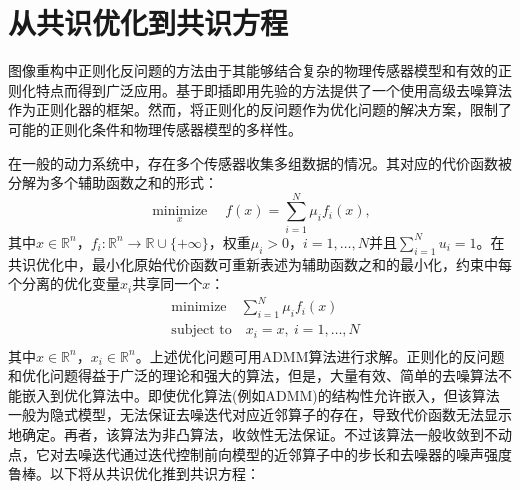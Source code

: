 \section{从共识优化到共识方程}
图像重构中正则化反问题的方法由于其能够结合复杂的物理传感器模型和有效的正则化特点而得到广泛应用\supercite{Gregery,Joon,Kamilov,Siavash,Yankun,Zhang}。基于即插即用先验的方法提供了一个使用高级去噪算法作为正则化器的框架。然而，将正则化的反问题作为优化问题的解决方案，限制了可能的正则化条件和物理传感器模型的多样性。

在一般的动力系统中，存在多个传感器收集多组数据的情况。其对应的代价函数被分解为多个辅助函数之和的形式：
\begin{equation} \label{problem:3-5}
	\mathop{\text{minimize}}\limits_{x}\quad f(x)=\sum_{i=1}^{N}\mu_{i}f_i(x),
\end{equation} 
其中$x\in\mathbb{R}^n$，$f_i\colon\mathbb{R}^n\to\mathbb{R}\cup\{+\infty\}$，权重$\mu_{i}>0$，$i=1,\ldots,N$并且$\sum_{i=1}^{N}{u_i}=1$。在共识优化中，最小化原始代价函数可重新表述为辅助函数之和的最小化，约束中每个分离的优化变量$x_i$共享同一个$x$：
\begin{equation} \label{problem:3-6}
	\begin{aligned}
		&\text{minimize}\quad\sum_{i=1}^{N}\mu_{i}f_i(x) \\
		&\text{subject\ to}\quad{x_{i} = x,\ i=1,\ldots,N} \\
	\end{aligned}
\end{equation}
其中$x\in\mathbb{R}^n$，$x_{i}\in\mathbb{R}^n$。上述优化问题可用ADMM算法进行求解。正则化的反问题和优化问题得益于广泛的理论和强大的算法，但是，大量有效、简单的去噪算法不能嵌入到优化算法中。即使优化算法(例如ADMM)的结构性允许嵌入，但该算法一般为隐式模型，无法保证去噪迭代对应近邻算子的存在，导致代价函数无法显示地确定。再者，该算法为非凸算法，收敛性无法保证。不过该算法一般收敛到不动点，它对去噪迭代通过迭代控制前向模型的近邻算子中的步长和去噪器的噪声强度鲁棒。以下将从共识优化推到共识方程：

